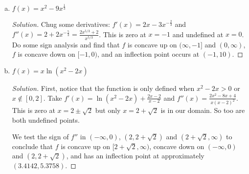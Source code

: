 \documentclass{agony}
\begin{document}
\begin{enumerate}[(a)]
\begin{proof}[Solution]
          Therefore, $f$ is concave up on $[2k\pi,2k\pi+\pi)$, concave down on $(2k\pi-\pi,2k\pi]$ and
          has an inflection point at $(2k\pi, 0)$ for any integer $k$.
        \end{proof}
  \item $f(x) = x^2-9x^{\frac{1}{3}}$
        \begin{proof}[Solution]
          Chug some derivatives: $f'(x) = 2x - 3x^{-\frac23}$
          and $f''(x) = 2 + 2x^{-\frac53} = \frac{2x^{5/3}+2}{x^{5/3}}$.
          This is zero at $x=-1$ and undefined at $x=0$.
          Do some sign analysis and find that $f$ is concave up on $(\infty,-1]$ and $(0,\infty)$,
          $f$ is concave down on $[-1,0)$, and an inflection point occurs at $(-1,10)$.
        \end{proof}
  \item $f(x) = x\ln(x^2-2x)$
        \begin{proof}[Solution]
          First, notice that the function is only defined when $x^2-2x > 0$ or $x \not\in [0,2]$.
          Take $f'(x) = \ln(x^2-2x) + \frac{2x-2}{x-2}$ and $f''(x) = \frac{2x^2-8x+4}{x(x-2)^2}$.
          This is zero at $x=2\pm\sqrt2$ but only $x=2+\sqrt2$ is in our domain.
          So too are both undefined points.

          We test the sign of $f''$ in $(-\infty,0)$, $(2,2+\sqrt2)$ and $(2+\sqrt2,\infty)$
          to conclude that $f$ is concave up on $[2+\sqrt2,\infty)$,
          concave down on $(-\infty,0)$ and $(2,2+\sqrt2)$,
          and has an inflection point at approximately $(3.4142, 5.3758)$.
        \end{proof}
\end{enumerate}
\end{document}
